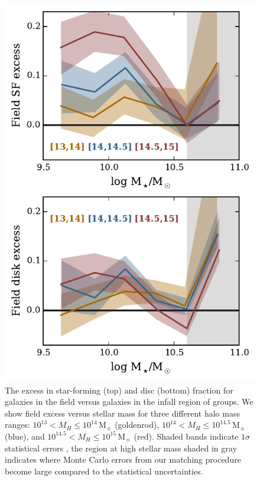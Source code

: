 \documentclass[a4paper,fleqn,usenatbib]{mnras}
\newcommand{\Msun}{\,\mathrm{M_{\sun}}}
\begin{document}
\begin{figure}
  \centering
  \includegraphics[width=\columnwidth]{mh_excess95.pdf}
  \caption{The excess in star-forming (top) and disc (bottom) fraction
  for galaxies in the field versus galaxies in the infall region of
  groups.  We show field excess versus stellar mass for three
  different halo mass ranges: $10^{13} < M_H \le 10^{14}\Msun$ (goldenrod),
  $10^{14} < M_H \le 10^{14.5}\Msun$ (blue), and $10^{14.5} < M_H \le
  10^{15}\Msun$ (red).  Shaded bands indicate $1\sigma$ statistical
  errors \citep{cameron2011}, the region at high stellar mass shaded
  in gray indicates where Monte Carlo errors from our matching
  procedure become large compared to the statistical uncertainties.}
  \label{fig:mh_excess}
\end{figure}
\end{document}
